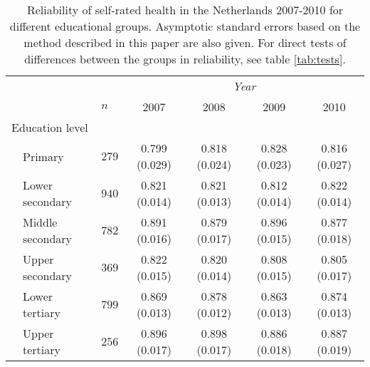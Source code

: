 \documentclass[a4paper, 11pt]{article}
\newcommand{\0}{\boldsymbol{0}}
\begin{document}
\begin{table}[ht]
\begin{center}
\begin{tabular}{lllcccc}  \hline  \hline
&&&  \multicolumn{4}{c}{\emph{Year}}\\\cline{4-7}
&&$n$& 2007&2008&2009&2010\\
  \hline
  \multicolumn{2}{l}{Education level}\\
& Primary	   & $279$  & 0.799 (0.029) & 0.818 (0.024) & 0.828 (0.023) & 0.816 (0.027) \\ 
& Lower secondary  & $940$  & 0.821 (0.014) & 0.821 (0.013) & 0.812 (0.014) & 0.822 (0.014) \\ 
& Middle secondary & $782$  & 0.891 (0.016) & 0.879 (0.017) & 0.896 (0.015) & 0.877 (0.018) \\ 
& Upper secondary  & $369$  & 0.822 (0.015) & 0.820 (0.014) & 0.808 (0.015) & 0.805 (0.017) \\ 
& Lower tertiary   & $799$  & 0.869 (0.013) & 0.878 (0.012) & 0.863 (0.013) & 0.874 (0.013) \\ 
& Upper tertiary   & $256$  & 0.896 (0.017) & 0.898 (0.017) & 0.886 (0.018) & 0.887 (0.019) \\ 
  \hline     \hline
\end{tabular}
\caption{Reliability of self-rated health in the Netherlands 2007-2010 for different educational groups. 
Asymptotic standard errors based on the method described in this paper are also given. For direct tests of 
differences between the groups in reliability, see table \ref{tab:tests}.}\label{tab:health-education}
\end{center}
\end{table}
\end{document}
